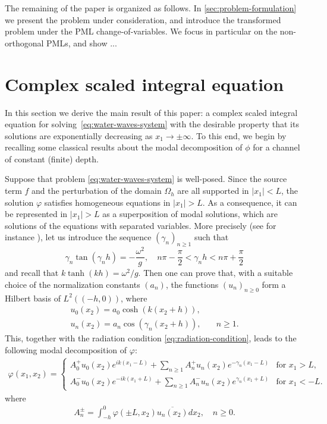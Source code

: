 \documentclass[11pt]{article}
\begin{document}
The remaining of the paper is organized as follows. In
\cref{sec:problem-formulation} we present the problem under consideration, and
introduce the transformed problem under the PML change-of-variables. We focus in
particular on the non-orthogonal PMLs, and show ...

\section{Complex scaled integral equation}

In this section we derive the main result of this paper: a complex scaled
integral equation for solving~\cref{eq:water-waves-system} with the desirable
property that its solutions are exponentially decreasing as $x_1 \to \pm
\infty$. To this end, we begin by recalling some classical results about the
modal decomposition of $\phi$ for a channel of constant (finite) depth. 

Suppose that problem \cref{eq:water-waves-system} is well-posed. Since the
source term $f$ and the perturbation of the domain $\Omega_h$ are all supported
in $|x_1|<L$,  the solution $\varphi$ satisfies homogeneous equations in
$|x_1|>L$. As a consequence, it can be represented in $|x_1|>L$ as a
superposition of modal solutions,  which are solutions of the equations with
separated variables. More precisely (see for instance \cite{Bon-Jol-1993}), let
us introduce the sequence $(\gamma_n)_{n\geq 1}$ such that
\begin{equation}
\label{eq:disp-evanescent}
\gamma_n\tan(\gamma_nh)=-\dfrac{\omega^2}{g},\quad n\pi-\frac{\pi}{2}<\gamma_n h<n\pi+\frac{\pi}{2}
    \end{equation}
    and recall that $k\tanh(kh)=\omega^2/g$. Then one can prove that, with a suitable choice of the normalization constants $(a_n)$, the functions $(u_n)_{n\geq 0}$ form a Hilbert basis of $L^2((-h,0))$, where
    \begin{align}
    \label{eq:transversemodes}
    u_0(x_2)=a_0\cosh(k(x_2+h)),&\\
    u_n(x_2)=a_n\cos(\gamma_n(x_2+h)),& \quad n\geq 1.
  \end{align}
This, together with the radiation condition \cref{eq:radiation-condition}, leads
to the following modal decomposition of $\varphi$:
%
\begin{align}
  \label{eq:modaldecomp}
  \varphi(x_1,x_2) = \begin{cases}
  A_0^+u_0(x_2)e^{ik(x_1-L)} + \sum_{n\geq 1}A_n^+u_n(x_2)e^{-\gamma_n(x_1-L)} &\mbox{for }x_1>L,\\
  A_0^-u_0(x_2)e^{-ik(x_1+L)} +\sum_{n\geq 1}A_n^-u_n(x_2)e^{\gamma_n(x_1+L)} &\mbox{for }x_1<-L.
  \end{cases}
\end{align}
where 
\begin{align}
  A_n^\pm=\int_{-h}^0\varphi(\pm L,x_2)\overline{u_n(x_2)}dx_2,\quad n\geq 0.  
\end{align}
\end{document}
